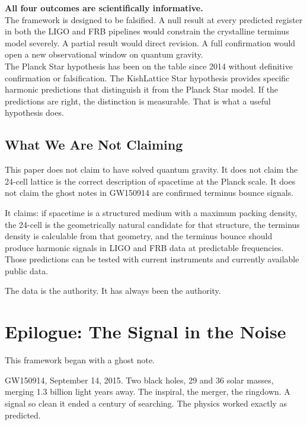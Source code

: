 \documentclass[11pt, letterpaper, openany]{book}
\begin{document}
\begin{warningbox}
\textbf{All four outcomes are scientifically informative.}\\[0.5em]
The framework is designed to be falsified. A null result at every predicted
register in both the LIGO and FRB pipelines would constrain the crystalline
terminus model severely. A partial result would direct revision. A full
confirmation would open a new observational window on quantum gravity.\\[0.5em]
The Planck Star hypothesis has been on the table since 2014 without definitive
confirmation or falsification. The KishLattice Star hypothesis provides
specific harmonic predictions that distinguish it from the Planck Star model.
If the predictions are right, the distinction is measurable. That is what
a useful hypothesis does.
\end{warningbox}

\section{What We Are Not Claiming}

This paper does not claim to have solved quantum gravity. It does not claim
the 24-cell lattice is the correct description of spacetime at the Planck
scale. It does not claim the ghost notes in GW150914 are confirmed terminus
bounce signals.

It claims: if spacetime is a structured medium with a maximum packing density,
the 24-cell is the geometrically natural candidate for that structure, the
terminus density is calculable from that geometry, and the terminus bounce
should produce harmonic signals in LIGO and FRB data at predictable
frequencies. Those predictions can be tested with current instruments
and currently available public data.

The data is the authority. It has always been the authority.

\clearpage
\chapter*{Epilogue: The Signal in the Noise}

This framework began with a ghost note.

GW150914, September 14, 2015. Two black holes, 29 and 36 solar masses,
merging 1.3 billion light years away. The inspiral, the merger, the
ringdown. A signal so clean it ended a century of searching. The physics
worked exactly as predicted.
\end{document}
